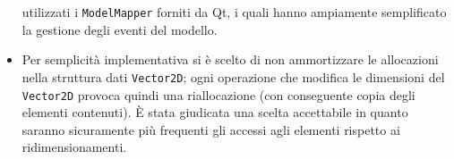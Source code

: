 \begin{itemize}
          utilizzati i \texttt{ModelMapper} forniti da Qt, i quali hanno ampiamente semplificato la gestione degli
          eventi del modello.
    \item Per semplicità implementativa si è scelto di non ammortizzare le allocazioni nella struttura dati
          \texttt{Vector2D}; ogni operazione che modifica le dimensioni del \texttt{Vector2D} provoca quindi una
          riallocazione (con conseguente copia degli elementi contenuti).
          È stata giudicata una scelta accettabile in quanto saranno sicuramente più frequenti gli accessi agli
          elementi rispetto ai ridimensionamenti.\\
\end{itemize}
